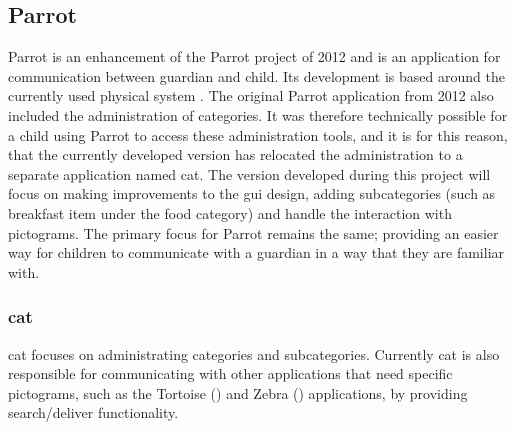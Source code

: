 \subsection{Parrot}
Parrot is an enhancement of the Parrot project of 2012 and is an application for communication between guardian and child. Its development is based around the currently used physical system . The original Parrot application from 2012 also included the administration of categories. It was therefore technically possible for a child using Parrot to access these administration tools, and it is for this reason, that the currently developed version has relocated the administration to a separate application named \acl{cat}. The version developed during this project will focus on making improvements to the \ac{gui} design, adding subcategories (such as breakfast item under the food category) and handle the interaction with pictograms. %
The primary focus for Parrot remains the same; providing an easier way for children to communicate with a guardian in a way that they are familiar with.

\subsubsection*{\acl{cat}}
\label{subsub:cat}
\ac{cat} focuses on administrating categories and subcategories. Currently \ac{cat} is also responsible for communicating with other applications that need specific pictograms, such as the Tortoise () and Zebra () applications, by providing search/deliver functionality. %
